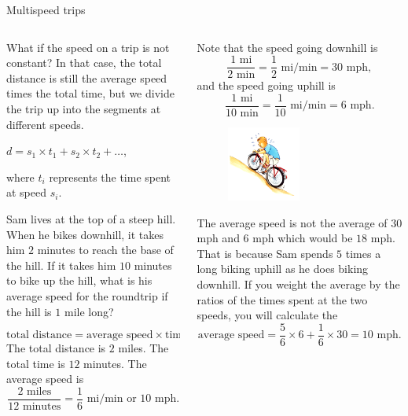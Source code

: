 \documentclass[9pt,aspectratio=169]{beamer}
\begin{document}
\begin{frame}{Multispeed trips}
  \begin{columns}[T]
    \begin{column}{0.5\textwidth}
      What if the speed on a trip is not constant?  In that case, the total distance is still the average speed times the total time, but we divide the trip up into the segments at different speeds.
      \begin{definition}
        {\centering
        $d = s_1 \times t_1 + s_2 \times t_2 + \ldots$,\par} 
        where $t_i$ represents the time spent at speed $s_i$.
      \end{definition}
      \begin{problem}
        Sam lives at the top of a steep hill.  When he bikes downhill, it takes him $2$ minutes to reach the base of the hill.  If it takes him $10$ minutes to bike up the hill, what is his average speed for the roundtrip if the hill is $1$ mile long?
      \end{problem}\vspace*{-1em}
      \[\text{total distance} = \text{average speed} \times \text{time}. \]
      The total distance is $2$ miles.  The total time is $12$ minutes.  The average speed is 
      \[ \frac{2\text{ miles}}{12\text{ minutes}} = \frac{1}{6}\text{ mi/min or $10$ mph}. \]
    \end{column}
    \begin{column}{0.5\textwidth}
      Note that the speed going downhill is 
      \[ \frac{1 \text{ mi}}{2 \text{ min}} = \frac{1}{2}\text{ mi/min} = 30\text{ mph}, \] 
      and the speed going uphill is 
      \[ \frac{1 \text{ mi}}{10 \text{ min}} = \frac{1}{10}\text{ mi/min} = 6\text{ mph}. \]
      \begin{figure}
        \vspace*{-1.8em}\hspace*{-1.5em}
        \includegraphics[width=0.5\textwidth]{09 - Rate/bike.png}
      \end{figure}
      The average speed is not the average of $30$ mph and $6$ mph which would be $18$ mph.  That is because Sam spends $5$ times a long biking uphill as he does biking downhill.  If you weight the average by the ratios of the times spent at the two speeds, you will calculate the
      \[ \text{average speed} = \frac{5}{6} \times 6 + \frac{1}{6} \times 30 = 10\text{ mph}.\]
    \end{column}
  \end{columns}
\end{frame}
\end{document}
